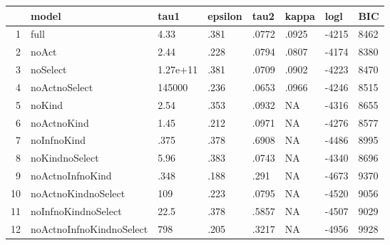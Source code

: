 \begin{table}[ht]
\centering
\begin{tabular}{rlllllll}
  \hline
 & model & tau1 & epsilon & tau2 & kappa & logl & BIC \\ 
  \hline
1 & full & 4.33 & .381 & .0772 & .0925 & -4215 & 8462 \\ 
  2 & noAct & 2.44 & .228 & .0794 & .0807 & -4174 & 8380 \\ 
  3 & noSelect & 1.27e+11 & .381 & .0709 & .0902 & -4223 & 8470 \\ 
  4 & noActnoSelect & 145000 & .236 & .0653 & .0966 & -4246 & 8515 \\ 
  5 & noKind & 2.54 & .353 & .0932 & NA & -4316 & 8655 \\ 
  6 & noActnoKind & 1.45 & .212 & .0971 & NA & -4276 & 8577 \\ 
  7 & noInfnoKind & .375 & .378 & .6908 & NA & -4486 & 8995 \\ 
  8 & noKindnoSelect & 5.96 & .383 & .0743 & NA & -4340 & 8696 \\ 
  9 & noActnoInfnoKind & .348 & .188 & .291 & NA & -4673 & 9370 \\ 
  10 & noActnoKindnoSelect & 109 & .223 & .0795 & NA & -4520 & 9056 \\ 
  11 & noInfnoKindnoSelect & 22.5 & .378 & .5857 & NA & -4507 & 9029 \\ 
  12 & noActnoInfnoKindnoSelect & 798 & .205 & .3217 & NA & -4956 & 9928 \\ 
   \hline
\end{tabular}
\end{table}

